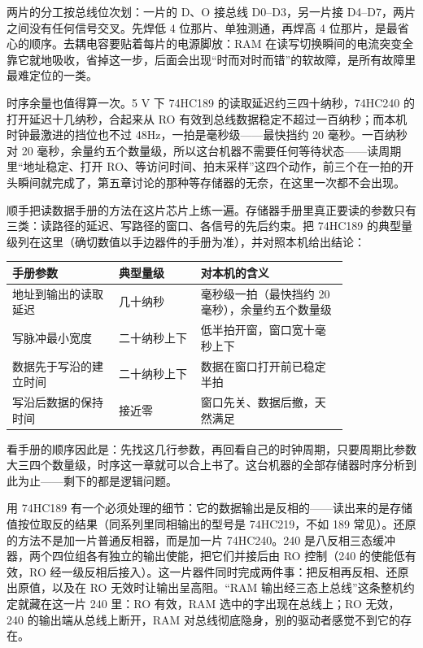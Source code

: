 两片的分工按总线位次划：一片的 D、O 接总线 D0–D3，另一片接 D4–D7，两片之间没有任何信号交叉。先焊低 4 位那片、单独测通，再焊高 4 位那片，是最省心的顺序。去耦电容要贴着每片的电源脚放：RAM 在读写切换瞬间的电流突变全靠它就地吸收，省掉这一步，后面会出现“时而对时而错”的软故障，是所有故障里最难定位的一类。

时序余量也值得算一次。5 V 下 74HC189 的读取延迟约三四十纳秒，74HC240 的打开延迟十几纳秒，合起来从 RO 有效到总线数据稳定不超过一百纳秒；而本机时钟最激进的挡位也不过 48Hz，一拍是毫秒级——最快挡约 20 毫秒。一百纳秒对 20 毫秒，余量约五个数量级，所以这台机器不需要任何等待状态——读周期里“地址稳定、打开 RO、等访问时间、拍末采样”这四个动作，前三个在一拍的开头瞬间就完成了，第五章讨论的那种等存储器的无奈，在这里一次都不会出现。

顺手把读数据手册的方法在这片芯片上练一遍。存储器手册里真正要读的参数只有三类：读路径的延迟、写路径的窗口、各信号的先后约束。把 74HC189 的典型量级列在这里（确切数值以手边器件的手册为准），并对照本机给出结论：

\begin{longtable}{L{0.26\linewidth}L{0.20\linewidth}L{0.36\linewidth}}
\toprule
手册参数 & 典型量级 & 对本机的含义 \\
\midrule
地址到输出的读取延迟 & 几十纳秒 & 毫秒级一拍（最快挡约 20 毫秒），余量约五个数量级 \\
写脉冲最小宽度 & 二十纳秒上下 & 低半拍开窗，窗口宽十毫秒上下 \\
数据先于写沿的建立时间 & 二十纳秒上下 & 数据在窗口打开前已稳定半拍 \\
写沿后数据的保持时间 & 接近零 & 窗口先关、数据后撤，天然满足 \\
\bottomrule
\end{longtable}

看手册的顺序因此是：先找这几行参数，再回看自己的时钟周期，只要周期比参数大三四个数量级，时序这一章就可以合上书了。这台机器的全部存储器时序分析到此为止——剩下的都是逻辑问题。

用 74HC189 有一个必须处理的细节：它的数据输出是反相的——读出来的是存储值按位取反的结果（同系列里同相输出的型号是 74HC219，不如 189 常见）。还原的方法不是加一片普通反相器，而是加一片 74HC240。240 是八反相三态缓冲器，两个四位组各有独立的输出使能，把它们并接后由 RO 控制（240 的使能低有效，RO 经一级反相后接入）。这一片器件同时完成两件事：把反相再反相、还原出原值，以及在 RO 无效时让输出呈高阻。“RAM 输出经三态上总线”这条整机约定就藏在这一片 240 里：RO 有效，RAM 选中的字出现在总线上；RO 无效，240 的输出端从总线上断开，RAM 对总线彻底隐身，别的驱动者感觉不到它的存在。

